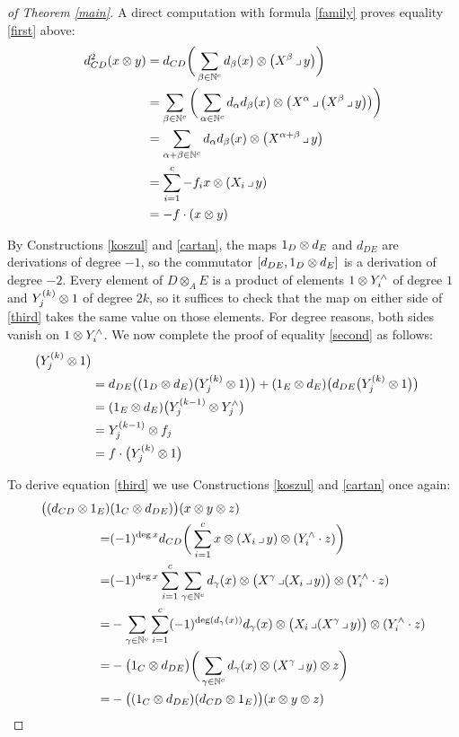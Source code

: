\begin{proof}[of Theorem \ref{main}]
A direct computation with formula \eqref{family} proves equality
\eqref{first} above:
\begin{align*}
d_{CD}^2(x\otimes y)
&=d_{CD}\bigg(\sum_{\beta\in{\mathbb N}^c} d_\beta(x)\otimes\big(X^{\beta}\operatorname{\lrcorner} y\big)\bigg)\\
&=\sum_{\beta\in{\mathbb N}^c}\bigg
(\sum_{\alpha\in{\mathbb N}^c}d_\alpha d_\beta(x)\otimes
\big(X^{\alpha}\operatorname{\lrcorner}\big(X^{\beta}\operatorname{\lrcorner} y\big)\big)\bigg)\\
&=\sum_{\alpha+\beta\in{\mathbb N}^c}d_\alpha d_\beta(x)\otimes \big(X^{\alpha+\beta}\operatorname{\lrcorner} y\big)\\
&=\sum_{i=1}^c -f_ix\otimes (X_i\operatorname{\lrcorner} y)\\
&= -f\cdot (x\otimes y)
\end{align*}

By Constructions \ref{koszul} and \ref{cartan}, the maps $1_D\otimes d_E$
and $d_{DE}$ are derivations of degree $-1$, so the commutator
$[d_{DE},1_D\otimes d_E]$ is a derivation of degree $-2$.  Every element of
$D \otimes_A E$ is a product of elements $1\otimes Y^\wedge_i$ of degree $1$
and $Y^{(k)}_j\otimes1$ of degree $2k$, so it suffices to check that the map
on either side of \eqref{third} takes the same value on those
elements.  For degree reasons, both sides vanish on $1\otimes Y^\wedge_i$.
We now complete the proof of equality \eqref{second} as follows:
\begin{align*}
[d_{DE}\,,\,&1_E\o d_E]\big(Y^{(k)}_j \o 1\big)\\
&=d_{DE}\big((1_D\o d_E)\big(Y^{(k)}_j \o 1\big)\big) +
(1_E\o d_E)\big(d_{DE}\big(Y^{(k)}_j \o 1\big)\big)\\
&= (1_E\o d_E)\big(Y^{(k-1)}_j \o Y_j^\wedge\big)\\
&= Y^{(k-1)}_j \o f_j\\
&= f\cdot\big(Y^{(k)}_j \o 1\big)
\end{align*}

To derive equation \eqref{third} we use Constructions \ref{koszul} and
\ref{cartan} once again:
\begin{align*}
\big((d_{CD}\otimes 1_E)&(1_C\otimes d_{DE})\big)(x\otimes y\otimes z)\\
=&(-1)^{\deg x} d_{CD}\bigg(
\sum_{i=1}^c x\otimes(X_i\operatorname{\lrcorner} y)\otimes(Y^\wedge_i\cdot z)\bigg)\\
=&(-1)^{\deg x} \sum_{i=1}^c \sum_{\gamma\in{\mathbb N}^c}
d_\gamma(x)\otimes\big(X^{\gamma}\operatorname{\lrcorner}(X_i\operatorname{\lrcorner} y)\big)
\otimes (Y^\wedge_i\cdot z)\\
=&-\sum_{\gamma\in{\mathbb N}^c} \sum_{i=1}^c 
(-1)^{\deg(d_\gamma(x))}d_\gamma(x)\otimes\big(X_i\operatorname{\lrcorner}(X^{\gamma}\operatorname{\lrcorner} y)\big)
\otimes (Y^\wedge_i\cdot z)\\
=&-\big(1_C\otimes d_{DE}\big)
\bigg(\sum_{\gamma\in{\mathbb N}^c}d_\gamma(x)\otimes(X^{\gamma}\operatorname{\lrcorner} y) \otimes z\bigg)\\
=&-\big((1_C\otimes d_{DE})(d_{CD}\otimes 1_E)\big)(x\otimes y\otimes z)
\end{align*}


\end{proof}
